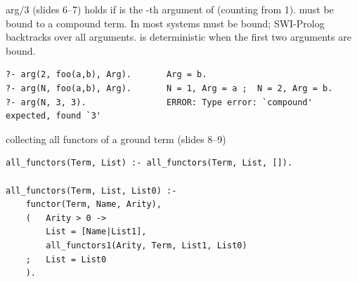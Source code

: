 \begin{nbdef}{arg/3 (slides 6--7)}
 holds if  is the -th argument of 
(counting from 1).  must be bound to a compound term. In most systems  must
be bound; SWI-Prolog backtracks over all arguments.  is deterministic when the
first two arguments are bound.
\begin{verbatim}
?- arg(2, foo(a,b), Arg).       Arg = b.
?- arg(N, foo(a,b), Arg).       N = 1, Arg = a ;  N = 2, Arg = b.
?- arg(N, 3, 3).                ERROR: Type error: `compound' expected, found `3'
\end{verbatim}
\end{nbdef}

\begin{nbexample}{collecting all functors of a ground term (slides 8--9)}
\begin{verbatim}
all_functors(Term, List) :- all_functors(Term, List, []).

all_functors(Term, List, List0) :-
    functor(Term, Name, Arity),
    (   Arity > 0 ->
        List = [Name|List1],
        all_functors1(Arity, Term, List1, List0)
    ;   List = List0
    ).


\end{verbatim}
\end{nbexample}
